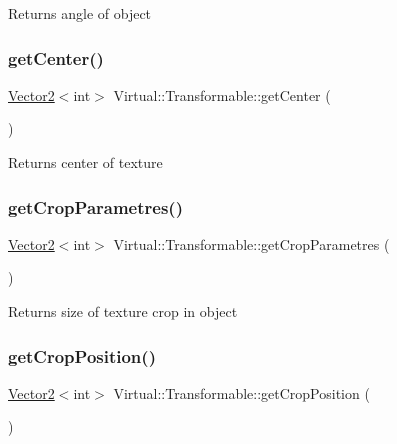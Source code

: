 \begin{DoxyReturn}{Returns}
angle of object 
\end{DoxyReturn}
\hypertarget{class_virtual_1_1_transformable_a703da601d8ef871a03b0da591edda2fe}{}\label{class_virtual_1_1_transformable_a703da601d8ef871a03b0da591edda2fe} 
\subsubsection{\texorpdfstring{get\+Center()}{getCenter()}}
{\footnotesize\ttfamily \hyperlink{struct_virtual_1_1_vector2}{Vector2}$<$int$>$ Virtual\+::\+Transformable\+::get\+Center (\begin{DoxyParamCaption}{ }\end{DoxyParamCaption})}

\begin{DoxyReturn}{Returns}
center of texture 
\end{DoxyReturn}
\hypertarget{class_virtual_1_1_transformable_a22aa918ae175dea89c27728a20c29f82}{}\label{class_virtual_1_1_transformable_a22aa918ae175dea89c27728a20c29f82} 
\subsubsection{\texorpdfstring{get\+Crop\+Parametres()}{getCropParametres()}}
{\footnotesize\ttfamily \hyperlink{struct_virtual_1_1_vector2}{Vector2}$<$int$>$ Virtual\+::\+Transformable\+::get\+Crop\+Parametres (\begin{DoxyParamCaption}{ }\end{DoxyParamCaption})}

\begin{DoxyReturn}{Returns}
size of texture crop in object 
\end{DoxyReturn}
\hypertarget{class_virtual_1_1_transformable_adbccc4539561975b0de4471d05ca7541}{}\label{class_virtual_1_1_transformable_adbccc4539561975b0de4471d05ca7541} 
\subsubsection{\texorpdfstring{get\+Crop\+Position()}{getCropPosition()}}
{\footnotesize\ttfamily \hyperlink{struct_virtual_1_1_vector2}{Vector2}$<$int$>$ Virtual\+::\+Transformable\+::get\+Crop\+Position (\begin{DoxyParamCaption}{ }\end{DoxyParamCaption})}

